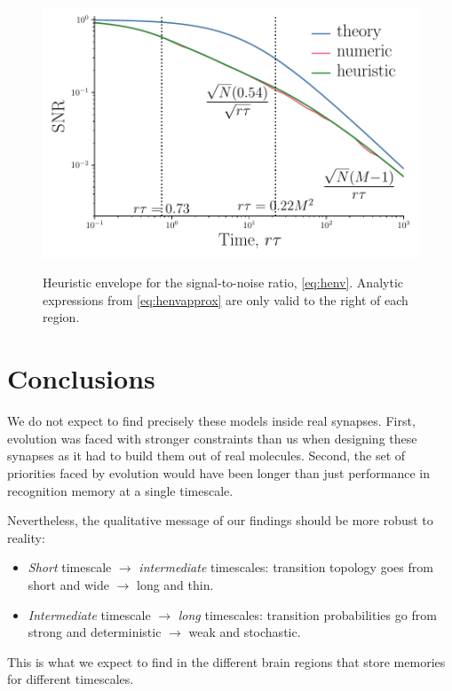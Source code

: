\documentclass[12pt]{article}
\begin{document}
\begin{figure}[tb]
  \centering
  \includegraphics[width=0.8\linewidth]{LenvHeuristic.pdf}\\
  \caption[Heuristic envelope for the signal-to-noise ratio]
  {Heuristic envelope  for the signal-to-noise ratio, \cref{eq:henv}.
  Analytic expressions from \cref{eq:henvapprox} are only valid to the right of each region.}\label{fig:heuristicenv}
\end{figure}


\section{Conclusions}\label{sec:conclusions}


We do not expect to find precisely these models inside real synapses.
First, evolution was faced with stronger constraints than us when designing these synapses as it had to build them out of real molecules.
Second, the set of priorities faced by evolution would have been longer than just performance in recognition memory at a single timescale.

Nevertheless, the qualitative message of our findings should be more robust to reality:
%
\begin{itemize}
  \item \emph{Short} timescale $\to$ \emph{intermediate} timescales: transition topology goes from \\ short and wide $\to$ long and thin.
  \item \emph{Intermediate} timescale $\to$ \emph{long} timescales: transition probabilities go from \\ strong and deterministic $\to$ weak and stochastic.
\end{itemize}
%
This is what we expect to find in the different brain regions that store memories for different timescales.
\end{document}
